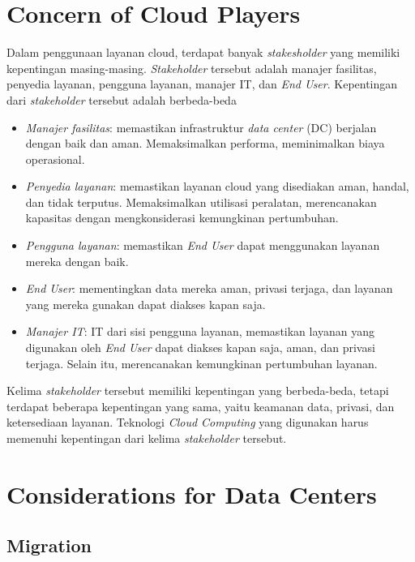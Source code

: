 \documentclass[conference]{IEEEtran}
\begin{document}
\section{Concern of Cloud Players}

Dalam penggunaan layanan cloud, terdapat banyak \textit{stakesholder} yang memiliki kepentingan masing-masing. \textit{Stakeholder} tersebut adalah manajer fasilitas, penyedia layanan, pengguna layanan, manajer IT, dan \textit{End User}. Kepentingan dari \textit{stakeholder} tersebut adalah berbeda-beda

\begin{itemize}
    \item \textit{Manajer fasilitas}: memastikan infrastruktur \textit{data center} (DC) berjalan dengan baik dan aman. Memaksimalkan performa, meminimalkan biaya operasional.
    \item \textit{Penyedia layanan}: memastikan layanan cloud yang disediakan aman, handal, dan tidak terputus. Memaksimalkan utilisasi peralatan, merencanakan kapasitas dengan mengkonsiderasi kemungkinan pertumbuhan.
    \item \textit{Pengguna layanan}: memastikan \textit{End User} dapat menggunakan layanan mereka dengan baik. 
    \item \textit{End User}: mementingkan data mereka aman, privasi terjaga, dan layanan yang mereka gunakan dapat diakses kapan saja.
    \item \textit{Manajer IT}: IT dari sisi pengguna layanan, memastikan layanan yang digunakan oleh \textit{End User} dapat diakses kapan saja, aman, dan privasi terjaga. Selain itu, merencanakan kemungkinan pertumbuhan layanan.
\end{itemize}

Kelima \textit{stakeholder} tersebut memiliki kepentingan yang berbeda-beda, tetapi terdapat beberapa kepentingan yang sama, yaitu keamanan data, privasi, dan ketersediaan layanan. Teknologi \textit{Cloud Computing} yang digunakan harus memenuhi kepentingan dari kelima \textit{stakeholder} tersebut.

\section{Considerations for Data Centers}

\subsection{Migration}
\end{document}
